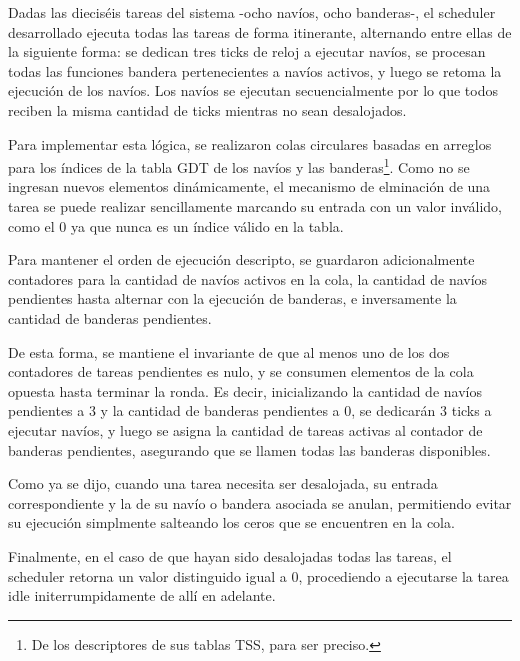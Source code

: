 
Dadas las dieciséis tareas del sistema -ocho navíos, ocho banderas-, el scheduler desarrollado ejecuta todas las tareas de forma itinerante, alternando entre ellas de la siguiente forma: se dedican tres ticks de reloj a ejecutar navíos, se procesan todas las funciones bandera pertenecientes a navíos activos, y luego se retoma la ejecución de los navíos. Los navíos se ejecutan secuencialmente por lo que todos reciben la misma cantidad de ticks mientras no sean desalojados.

Para implementar esta lógica, se realizaron colas circulares basadas en arreglos para los índices de la tabla GDT de los navíos y las banderas\footnote{De los descriptores de sus tablas TSS, para ser preciso.}. Como no se ingresan nuevos elementos dinámicamente, el mecanismo de elminación de una tarea se puede realizar sencillamente marcando su entrada con un valor inválido, como el 0 ya que nunca es un índice válido en la tabla.

Para mantener el orden de ejecución descripto, se guardaron adicionalmente contadores para la cantidad de navíos activos en la cola, la cantidad de navíos pendientes hasta alternar con la ejecución de banderas, e inversamente la cantidad de banderas pendientes.

De esta forma, se mantiene el invariante de que al menos uno de los dos contadores de tareas pendientes es nulo, y se consumen elementos de la cola opuesta hasta terminar la ronda. Es decir, inicializando la cantidad de navíos pendientes a 3 y la cantidad de banderas pendientes a 0, se dedicarán 3 ticks a ejecutar navíos, y luego se asigna la cantidad de tareas activas al contador de banderas pendientes, asegurando que se llamen todas las banderas disponibles.

Como ya se dijo, cuando una tarea necesita ser desalojada, su entrada correspondiente y la de su navío o bandera asociada se anulan, permitiendo evitar su ejecución simplmente salteando los ceros que se encuentren en la cola.

Finalmente, en el caso de que hayan sido desalojadas todas las tareas, el scheduler retorna un valor distinguido igual a 0, procediendo a ejecutarse la tarea idle initerrumpidamente de allí en adelante.